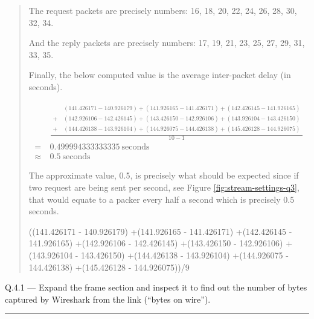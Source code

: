 \documentclass{article}
\newcommand\Que[2]{%
\begin{samepage}
\leavevmode\par
\noindent
Q.#1 --- #2\par\vspace{10pt}\hrule\vspace{10pt}
\end{samepage}}
\newenvironment{ans}
{\fbox{Answer}\begin{quote}\nopagebreak}
{\end{quote}}
\begin{document}
\begin{ans}
The request packets are precisely numbers: 16, 18, 20, 22,
24, 26, 28, 30, 32, 34.

And the reply packets are precisely numbers: 17, 19, 21,
23, 25, 27, 29, 31, 33, 35.

Finally, the below computed value is the average
inter-packet delay (in seconds).

$$
\begin{aligned}
          & \frac{
\begin{aligned}
    & (141.426171 - 140.926179)
+(141.926165 - 141.426171)
+(142.426145 - 141.926165)      \\
+\  & (142.926106 - 142.426145)
+(143.426150 - 142.926106)
+(143.926104 - 143.426150)      \\
+\  & (144.426138 - 143.926104)
+(144.926075 - 144.426138)
+(145.426128 - 144.926075)
\end{aligned}
}{10 - 1}                                     \\
=\        & 0.499994333333335\ \text{seconds} \\
\approx\  & 0.5\ \text{seconds}
\end{aligned}
$$

The approximate value, 0.5, is precisely what should be
expected since if two request are being sent per second,
see Figure \ref{fig:stream-settings-q3}, that would equate
to a packer every half a second which is precisely 0.5
seconds.

\begin{gruvboxlisting}[language=Python,caption={Python
expression for calculating the inter-packet delay for
Question 3.}]
((141.426171 - 140.926179)
+(141.926165 - 141.426171)
+(142.426145 - 141.926165)
+(142.926106 - 142.426145)
+(143.426150 - 142.926106)
+(143.926104 - 143.426150)
+(144.426138 - 143.926104)
+(144.926075 - 144.426138)
+(145.426128 - 144.926075))/9
\end{gruvboxlisting}
\end{ans}

\Que{4.1}{Expand the frame section and inspect it to find out
the number of bytes captured by Wireshark from the link (``bytes
on wire'').}
\end{document}
